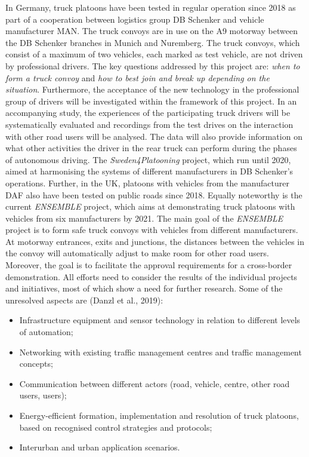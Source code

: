 \documentclass[
]{book}
\providecommand{\tightlist}{%
  \setlength{\itemsep}{0pt}\setlength{\parskip}{0pt}}
\begin{document}
In Germany, truck platoons have been tested in regular operation since 2018 as part of a cooperation between logistics group DB Schenker and vehicle manufacturer MAN. The truck convoys are in use on the A9 motorway between the DB Schenker branches in Munich and Nuremberg. The truck convoys, which consist of a maximum of two vehicles, each marked as test vehicle, are not driven by professional drivers. The key questions addressed by this project are: \emph{when to form a truck convoy} and \emph{how to best join and break up depending on the situation}. Furthermore, the acceptance of the new technology in the professional group of drivers will be investigated within the framework of this project. In an accompanying study, the experiences of the participating truck drivers will be systematically evaluated and recordings from the test drives on the interaction with other road users will be analysed. The data will also provide information on what other activities the driver in the rear truck can perform during the phases of autonomous driving.
The \emph{Sweden4Platooning} project, which run until 2020, aimed at harmonising the systems of different manufacturers in DB Schenker's operations. Further, in the UK, platoons with vehicles from the manufacturer DAF also have been tested on public roads since 2018. Equally noteworthy is the current \emph{ENSEMBLE} project, which aims at demonstrating truck platoons with vehicles from six manufacturers by 2021. The main goal of the \emph{ENSEMBLE} project is to form safe truck convoys with vehicles from different manufacturers. At motorway entrances, exits and junctions, the distances between the vehicles in the convoy will automatically adjust to make room for other road users. Moreover, the goal is to facilitate the approval requirements for a cross-border demonstration. All efforts need to consider the results of the individual projects and initiatives, most of which show a need for further research. Some of the unresolved aspects are (Danzl et al., 2019):

\begin{itemize}
\tightlist
\item
  Infrastructure equipment and sensor technology in relation to different levels of automation;
\item
  Networking with existing traffic management centres and traffic management concepts;
\item
  Communication between different actors (road, vehicle, centre, other road users, users);
\item
  Energy-efficient formation, implementation and resolution of truck platoons, based on recognised control strategies and protocols;
\item
  Interurban and urban application scenarios.
\end{itemize}
\end{document}
